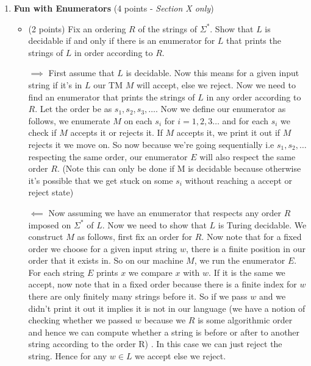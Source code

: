 \documentclass[11pt]{article}
\begin{document}
\begin{enumerate}
\item \textbf{Fun with Enumerators} (4 points - \textit{Section X only})

\begin{itemize}
    \item (2 points) Fix an ordering $R$ of the strings of $\Sigma^*$. Show that $L$ is decidable if and only if there is an enumerator for $L$ that prints the strings of $L$ in order according to $R$. \\
    
    \begin{answer}
        $\implies$ First assume that $L$ is decidable. Now this means for a given input string if it's in $L$ our TM $M$ will accept, else we reject. Now we need to find an enumerator that prints the strings of $L$ in any order according to $R$. Let the order be as $s_{1}, s_{2}, s_{3}, \dots$. Now we define our enumerator as follows, we enumerate $M$ on each $s_i$ for $i = 1, 2, 3 \dots$ and for each $s_i$ we check if $M$ accepts it or rejects it. If $M$ accepts it, we print it out if $M$ rejects it we move on. So now because we're going sequentially i.e $s_{1}, s_{2}, \dots$ respecting the same order, our enumerator $E$ will also respect the same order $R$. (Note this can only be done if M is decidable because otherwise it's possible that we get stuck on some $s_i$ without reaching a accept or reject state)

        \vspace{1em}
        $\impliedby$ Now assuming we have an enumerator that respects any order $R$ imposed on $\Sigma^*$  of $L$. Now we need to show that $L$ is Turing decidable. We construct $M$ as follows, first fix an order for $R$. Now note that for a fixed order we choose for a given input string $w$, there is a finite position in our order that it exists in. So on our machine $M$, we run the enumerator $E$. For each string $E$ prints $x$ we compare $x$ with $w$. If it is the same we accept, now note that in a fixed order because there is a finite index for $w$ there are only finitely many strings before it. So if we pass $w$ and we didn't print it out it  implies it is not in our language (we have a notion of checking whether we passed $w$ because we $R$ is some algorithmic order and hence we can compute whether a string is before or after to another string according to the order R) . In this case we can just reject the string. Hence for any $w \in L$ we accept else we reject.

    \end{answer}


\end{itemize}
\end{enumerate}
\end{document}
